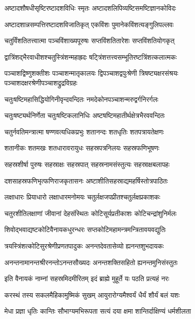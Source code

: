 \twolineshloka
{अष्टादशौषधीसृष्टिरष्टादशविधिः स्मृतः}
{अष्टादशलिपिव्यष्टिसमष्टिज्ञानकोविदः}

\twolineshloka
{अष्टादशान्नसम्पत्तिरष्टादशविजातिकृत्}
{एकविंशः पुमानेकविंशत्यङ्गुलिपल्लवः}

\twolineshloka
{चतुर्विंशतितत्त्वात्मा पञ्चविंशाख्यपूरुषः}
{सप्तविंशतितारेशः सप्तविंशतियोगकृत्}

\twolineshloka
{द्वात्रिंशद्भैरवाधीशश्चतुस्त्रिंशन्महाह्रदः}
{षट्त्रिंशत्तत्त्वसम्भूतिरष्टत्रिंशत्कलात्मकः}

\threelineshloka
{पञ्चाशद्विष्णुशक्तीशः पञ्चाशन्मातृकालयः}
{द्विपञ्चाशद्वपुःश्रेणी त्रिषष्ट्यक्षरसंश्रयः}
{पञ्चाशदक्षरश्रेणीपञ्चाशद्रुद्रविग्रहः}

\twolineshloka
{चतुःषष्टिमहासिद्धियोगिनीवृन्दवन्दितः}
{नमदेकोनपञ्चाशन्मरुद्वर्गनिरर्गलः}

\twolineshloka
{चतुःषष्ट्यर्थनिर्णेता चतुःषष्टिकलानिधिः}
{अष्टषष्टिमहातीर्थक्षेत्रभैरववन्दितः}

\twolineshloka
{चतुर्नवतिमन्त्रात्मा षण्णवत्यधिकप्रभुः}
{शतानन्दः शतधृतिः शतपत्रायतेक्षणः}

\twolineshloka
{शतानीकः शतमखः शतधारावरायुधः}
{सहस्रपत्रनिलयः सहस्रफणिभूषणः}

\twolineshloka
{सहस्रशीर्षा पुरुषः सहस्राक्षः सहस्रपात्}
{सहस्रनामसंस्तुत्यः सहस्राक्षबलापहः}

\twolineshloka
{दशसाहस्रफणिभृत्फणिराजकृतासनः}
{अष्टाशीतिसहस्राद्यमहर्षिस्तोत्रपाठितः}

\twolineshloka
{लक्षाधारः प्रियाधारो लक्षाधारमनोमयः}
{चतुर्लक्षजपप्रीतश्चतुर्लक्षप्रकाशकः}

\twolineshloka
{चतुरशीतिलक्षाणां जीवानां देहसंस्थितः}
{कोटिसूर्यप्रतीकाशः कोटिचन्द्रांशुनिर्मलः}

\twolineshloka
{शिवोद्भवाद्यष्टकोटिवैनायकधुरन्धरः}
{सप्तकोटिमहामन्त्रमन्त्रितावयवद्युतिः}

\twolineshloka
{त्रयस्त्रिंशत्कोटिसुरश्रेणीप्रणतपादुकः}
{अनन्तदेवतासेव्यो ह्यनन्तशुभदायकः}

\twolineshloka
{अनन्तनामानन्तश्रीरनन्तोऽनन्तसौख्यदः}
{अनन्तशक्तिसहितो ह्यनन्तमुनिसंस्तुतः}


\twolineshloka
{इति वैनायकं नाम्नां सहस्रमिदमीरितम्}
{इदं ब्राह्मे मुहूर्ते यः पठति प्रत्यहं नरः}

\twolineshloka
{करस्थं तस्य सकलमैहिकामुष्मिकं सुखम्}
{आयुरारोग्यमैश्वर्यं धैर्यं शौर्यं बलं यशः}

\twolineshloka
{मेधा प्रज्ञा धृतिः कान्तिः सौभाग्यमभिरूपता}
{सत्यं दया क्षमा शान्तिर्दाक्षिण्यं धर्मशीलता}

